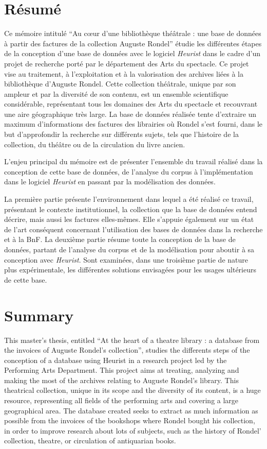 \documentclass[12pt,twoside]{book}
\begin{document}
	\chapter{Résumé}
\medskip
	Ce mémoire intitulé \enquote{Au cœur d'une bibliothèque théâtrale : une base de données à partir des factures de la collection Auguste Rondel} étudie les différentes étapes de la conception d’une base de données avec le logiciel \emph{Heurist} dans le cadre d’un projet de recherche porté par le département des Arts du spectacle. Ce projet 
vise au traitement, à l’exploitation et à la valorisation des archives liées à la bibliothèque d’Auguste Rondel. Cette collection théâtrale, unique par son ampleur et par la diversité de son contenu, est un ensemble scientifique considérable, représentant tous les domaines des Arts du spectacle et recouvrant une aire géographique très large. La base de données réalisée tente d’extraire un maximum d’informations des factures des librairies où Rondel s’est fourni, dans le but d’approfondir la recherche sur différents sujets, tels que l’histoire de la collection, du théâtre ou de la circulation du livre ancien. 

L’enjeu principal du mémoire est de présenter l’ensemble du travail réalisé dans la conception de cette base de données, de l’analyse du corpus à l’implémentation dans le logiciel \emph{Heurist} en passant par la modélisation des données. 

La première partie présente l’environnement dans lequel a été réalisé ce travail, présentant le contexte institutionnel, la collection que la base de données entend décrire, mais aussi les factures elles-mêmes. Elle s’appuie également sur un état de l’art conséquent concernant l’utilisation des bases de données dans la recherche et à la BnF. La deuxième partie résume toute la conception de la base de données, partant de l’analyse du corpus et de la modélisation pour aboutir à sa conception avec \emph{Heurist}. Sont examinées, dans une troisième partie de nature plus expérimentale, les différentes solutions envisagées pour les usages ultérieurs de cette base.  
	
	\chapter{Summary}

	This master's thesis, entitled \enquote{At the heart of a theatre library : a database from the invoices of Auguste Rondel's collection}, studies the differents steps of the conception of a database using Heurist in a research project led by the Performing Arts Department. This project aims at treating, analyzing and making the most of the archives relating to Auguste Rondel’s library. This theatrical collection, unique in its scope and the diversity of its content, is a huge resource, representing all fields of the performing arts and covering a large geographical area. The database created seeks to extract as much information as possible from the invoices of the bookshops where Rondel bought his collection, in order to improve research about lots of subjects, such as the history of Rondel' collection, theatre, or circulation of antiquarian books.
\end{document}
